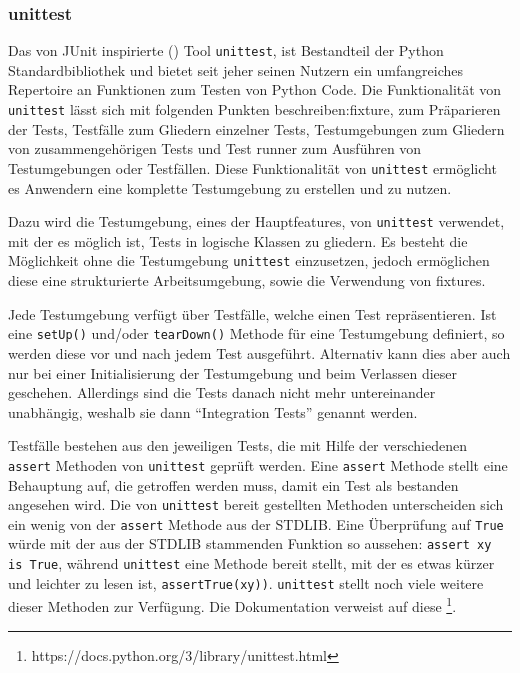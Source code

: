 \subsubsection{unittest}\label{python-tools:unittest}
Das von JUnit inspirierte (\cite{docs.python:unittest}) Tool
\lstinline{unittest}, ist Bestandteil der Python Standardbibliothek und bietet
seit jeher seinen Nutzern ein umfangreiches Repertoire an Funktionen zum Testen
von Python Code.
\noindent
Die Funktionalität von \lstinline{unittest} lässt sich mit folgenden Punkten
beschreiben:\Gls{fixture}, zum Präparieren der Tests, Testfälle zum Gliedern
einzelner Tests, Testumgebungen zum Gliedern von zusammengehörigen Tests und
Test runner zum Ausführen von Testumgebungen oder Testfällen.
Diese Funktionalität von \lstinline{unittest} ermöglicht es Anwendern eine
komplette Testumgebung zu erstellen und zu nutzen.
\newline

Dazu wird die Testumgebung, eines der Hauptfeatures, von \lstinline{unittest}
verwendet, mit der es möglich ist, Tests in logische Klassen zu gliedern. Es
besteht die Möglichkeit ohne die Testumgebung \lstinline{unittest} einzusetzen, 
jedoch ermöglichen diese eine strukturierte Arbeitsumgebung, sowie die
Verwendung von \Glspl{fixture}.

Jede Testumgebung verfügt über Testfälle, welche einen Test repräsentieren.
Ist eine \lstinline{setUp()} und/oder \lstinline{tearDown()} Methode für eine
Testumgebung definiert, so werden diese vor und nach jedem Test ausgeführt.
Alternativ kann dies aber auch nur bei einer Initialisierung der Testumgebung
und beim Verlassen dieser geschehen. Allerdings sind die Tests danach nicht
mehr untereinander unabhängig, weshalb sie dann "`Integration Tests"' genannt
werden.

Testfälle bestehen aus den jeweiligen Tests, die mit Hilfe der verschiedenen
\lstinline{assert} Methoden von \lstinline{unittest} geprüft werden. Eine
\lstinline{assert} Methode stellt eine Behauptung auf, die getroffen werden
muss, damit ein Test als bestanden angesehen wird. Die von \lstinline{unittest}
bereit gestellten Methoden unterscheiden sich ein wenig von der
\lstinline{assert} Methode aus der STDLIB. Eine Überprüfung auf
\lstinline{True} würde mit der aus der STDLIB stammenden Funktion so aussehen:
\lstinline{assert xy is True}, während \lstinline{unittest} eine Methode bereit
stellt, mit der es etwas kürzer und leichter zu lesen ist,
\lstinline{assertTrue(xy))}. \lstinline{unittest} stellt noch viele weitere
dieser Methoden zur Verfügung. Die Dokumentation verweist auf diese
\footnote{https://docs.python.org/3/library/unittest.html}.

